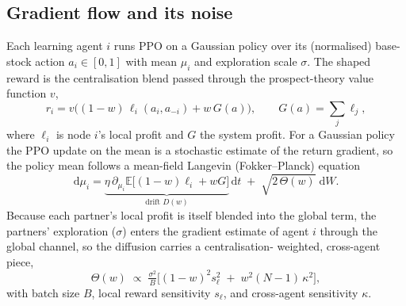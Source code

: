 \documentclass[11pt]{article}
\begin{document}
\subsection{Gradient flow and its noise}
Each learning agent $i$ runs PPO on a Gaussian policy over its (normalised)
base-stock action $a_i\in[0,1]$ with mean $\mu_i$ and exploration scale
$\sigma$. The shaped reward is the centralisation blend passed through the
prospect-theory value function $v$,
\begin{equation}
  r_i = v\!\big((1-w)\,\ell_i(a_i,a_{-i}) + w\,G(a)\big),
  \qquad G(a)=\textstyle\sum_j \ell_j ,
  \label{eq:blend}
\end{equation}
where $\ell_i$ is node $i$'s local profit and $G$ the system profit. For a
Gaussian policy the PPO update on the mean is a stochastic estimate of the
return gradient, so the policy mean follows a mean-field Langevin
(Fokker--Planck) equation
\begin{equation}
  \mathrm{d}\mu_i = \underbrace{\eta\,\partial_{\mu_i}\mathbb{E}\big[(1{-}w)\ell_i + wG\big]}_{\text{drift } D(w)}\,\mathrm{d}t
  \;+\; \sqrt{2\,\Theta(w)}\;\mathrm{d}W .
  \label{eq:langevin}
\end{equation}
Because each partner's local profit is itself blended into the global term,
the partners' exploration ($\sigma$) enters the gradient estimate of agent
$i$ through the global channel, so the diffusion carries a centralisation-
weighted, cross-agent piece,
\begin{equation}
  \Theta(w)\;\propto\;\tfrac{\sigma^2}{B}\big[(1{-}w)^2 s_\ell^2 \;+\; w^2 (N{-}1)\,\kappa^2\big],
  \label{eq:diffusion}
\end{equation}
with batch size $B$, local reward sensitivity $s_\ell$, and cross-agent
sensitivity $\kappa$.
\end{document}
